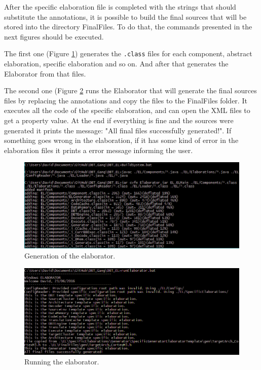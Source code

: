 \documentclass[11pt]{report}
\begin{document}
	After the specific elaboration file is completed with the strings that should substitute the annotations, it is possible to build the final sources that will be stored into the directory FinalFiles. To do that, the commands presented in the next figures should be executed.
	
	The first one (Figure \ref{fig:build}) generates the \texttt{.class} files for each component, abstract elaboration, specific elaboration and so on. And after that generates the Elaborator from that files.
	
	The second one (Figure \ref{fig:runElaborator} runs the Elaborator that will generate the final sources files by replacing the annotations and copy the files to the FinalFiles folder. It executes all the code of the specific elaboration, and can open the XML files to get a property value. At the end if everything is fine and the sources were generated it prints the message: "All final files successfully generated!". If something goes wrong in the elaboration, if it has some kind of error in the elaboration files it prints a error message informing the user.
	
	\begin{figure} [H]
		\centering
		\includegraphics[width=1\linewidth]{Images/script}
		\caption{Generation of the elaborator.}
		\label{fig:build}
	\end{figure}
	
	\begin{figure} [H]
		\centering
		\includegraphics[width=1\linewidth]{Images/scriptRunElaborator}
		\caption{Running the elaborator.}
		\label{fig:runElaborator}
	\end{figure}
	
\end{document}
